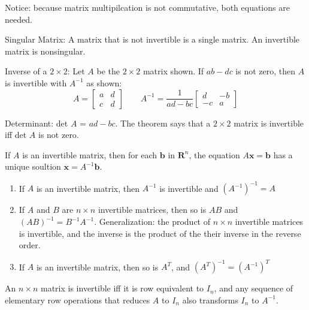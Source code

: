 \documentclass[../linalg.tex]{subfiles}
\begin{document}
Notice: because matrix multipilcation is not commutative, both equations are needed.

Singular Matrix: A matrix that is not invertible is a single matrix. An invertible matrix is nonsingular.

\begin{theorem}
    Inverse of a $2\times 2$: Let $A$ be the $2\times 2$ matrix shown. If $ab-dc$ is not zero, then $A$ is invertible with $A^{-1}$ as shown:
    \[ A = \begin{bmatrix}
        a & d \\
        c & d
    \end{bmatrix} \qquad A^{-1}=\frac{1}{ad-bc}\begin{bmatrix}
        d & -b \\ 
        -c & a 
    \end{bmatrix} \]
\end{theorem}

Determinant: det $A$ = $ad-bc$. The theorem says that a $2\times 2$ matrix is invertible iff det $A$ is not zero.

\begin{theorem}
    If $A$ is an invertible matrix, then for each $\textbf{b}$ in $\textbf{R}^n$, the equation $A\textbf{x}=\textbf{b}$ has a unique soultion $\textbf{x}=A^{-1}\textbf{b}$.
\end{theorem}

\begin{theorem}
    \begin{enumerate}
        \item If $A$ is an invertible matrix, then $A^{-1}$ is invertible and $(A^{-1})^{-1}=A$
        \item If $A$ and $B$ are $n\times n$ invertible matrices, then so is $AB$ and $(AB)^{-1}=B^{-1}A^{-1}$. Generalization: the product of $n\times n$ invertible matrices is invertible, and the inverse is the product of the their inverse in the reverse order.
        \item If $A$ is an invertible matrix, then so is $A^T$, and $(A^T)^{-1} = (A^{-1})^T$
    \end{enumerate}
\end{theorem}

\begin{theorem}
    An $n\times n$ matrix is invertible iff it is row equivalent to $I_n$, and any sequence of elementary row operations that reduces $A$ to $I_n$ also transforms $I_n$ to $A^{-1}$.
\end{theorem}
\end{document}

